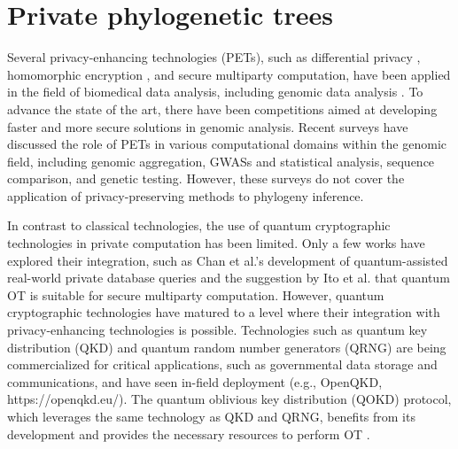


%

\chapter{Private phylogenetic trees}
\label{ch:phylogenetic-trees}

Several privacy-enhancing technologies (PETs), such as differential privacy \cite{Li2016}, homomorphic encryption \cite{Armknecht2015}, and secure multiparty computation, have been applied in the field of biomedical data analysis, including genomic data analysis \cite{Verhaert2018, Scardapane2017, Maulany2018, Kikuchi2018, Tawfik2018}. To advance the state of the art, there have been competitions \cite{Wang2017} aimed at developing faster and more secure solutions in genomic analysis. Recent surveys \cite{MY19, Naveed2015} have discussed the role of PETs in various computational domains within the genomic field, including genomic aggregation, GWASs and statistical analysis, sequence comparison, and genetic testing. However, these surveys do not cover the application of privacy-preserving methods to phylogeny inference.

In contrast to classical technologies, the use of quantum cryptographic technologies in private computation has been limited. Only a few works have explored their integration, such as Chan et al.'s development of quantum-assisted real-world private database queries \cite{Chan2014} and the suggestion by Ito et al. \cite{Ito2017} that quantum OT is suitable for secure multiparty computation. However, quantum cryptographic technologies have matured to a level where their integration with privacy-enhancing technologies is possible. Technologies such as quantum key distribution (QKD) and quantum random number generators (QRNG) are being commercialized for critical applications, such as governmental data storage and communications, and have seen in-field deployment (e.g., OpenQKD, https://openqkd.eu/). The quantum oblivious key distribution (QOKD) protocol, which leverages the same technology as QKD and QRNG, benefits from its development and provides the necessary resources to perform OT \cite{Lemus20, JSGBBWZ11, KWW12}.


